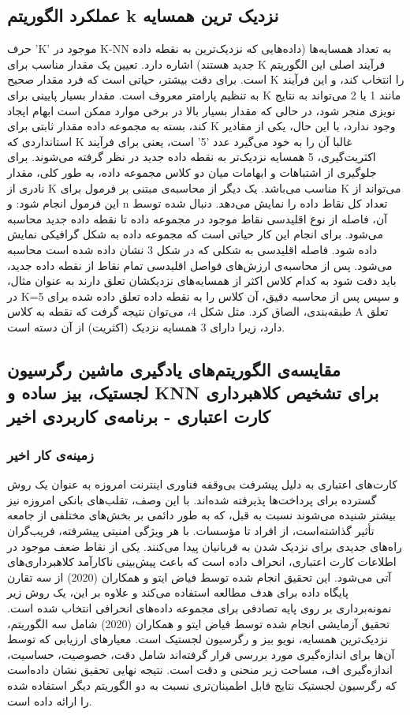 \documentclass{CSICC2020}
\begin{document}
\subsection{  عملکرد الگوریتم k نزدیک ترین همسایه}
حرف 'K' موجود در K-NN به تعداد همسایه‌ها (داده‌هایی که نزدیک‌ترین به نقطه داده جدید هستند) اشاره دارد. تعیین یک مقدار مناسب برای K فرآیند اصلی این الگوریتم است. برای دقت بیشتر، حیاتی است که فرد مقدار صحیح K را انتخاب کند، و این فرآیند به تنظیم پارامتر معروف است. مقدار بسیار پایینی برای K مانند 1 یا 2 می‌تواند به نتایج نویزی منجر شود، در حالی که مقدار بسیار بالا در برخی موارد ممکن است ابهام ایجاد کند، بسته به مجموعه داده مقدار ثابتی برای K وجود ندارد، با این حال، یکی از مقادیر استانداردی که K غالبا آن را به خود می‌گیرد عدد '5' است، یعنی برای فرآیند اکثریت‌گیری، 5 همسایه نزدیک‌تر به نقطه داده جدید در نظر گرفته می‌شوند. برای جلوگیری از اشتباهات و ابهامات میان دو کلاس مجموعه داده، به طور کلی، مقدار نادری از K مناسب می‌باشد. یک دیگر از محاسبه‌ی مبتنی بر فرمول برای K می‌تواند از این فرمول انجام شود: و n تعداد کل نقاط داده را نمایش می‌دهد. دنبال شده توسط آن، فاصله از نوع اقلیدسی نقاط موجود در مجموعه داده تا نقطه داده جدید محاسبه می‌شود. برای انجام این کار حیاتی است که مجموعه داده به شکل گرافیکی نمایش داده شود. فاصله اقلیدسی به شکلی که در شکل 3 نشان داده شده است محاسبه می‌شود. پس از محاسبه‌ی ارزش‌های فواصل اقلیدسی تمام نقاط از نقطه داده جدید، باید دقت شود به کدام کلاس اکثر از همسایه‌های نزدیکشان تعلق دارند به عنوان مثال، در K=5 و سپس پس از محاسبه دقیق، آن کلاس را به نقطه داده تعلق داده شده برای طبقه‌بندی، الصاق کرد. مثل شکل 4، می‌توان نتیجه گرفت که نقطه به کلاس A تعلق دارد، زیرا دارای 3 همسایه نزدیک (اکثریت) از آن دسته است.
\subsection{مقایسه‌ی الگوریتم‌های یادگیری ماشین رگرسیون لجستیک، بیز ساده و KNN  برای تشخیص کلاهبرداری کارت اعتباری - برنامه‌ی کاربردی اخیر}


\subsubsection{زمینه‌ی کار اخیر}
کارت‌های اعتباری به دلیل پیشرفت بی‌وقفه فناوری اینترنت امروزه به عنوان یک روش گسترده برای پرداخت‌ها پذیرفته شده‌اند. با این وصف، تقلب‌های بانکی امروزه نیز بیشتر شنیده می‌شوند نسبت به قبل، که به طور دائمی بر بخش‌های مختلفی از جامعه تأثیر گذاشته‌است، از افراد تا مؤسسات. با هر ویژگی امنیتی پیشرفته، فریب‌گران راه‌های جدیدی برای نزدیک شدن به قربانیان پیدا می‌کنند. یکی از نقاط ضعف موجود در اطلاعات کارت اعتباری، انحراف داده است که باعث پیش‌بینی ناکارآمد کلاهبرداری‌های آتی می‌شود. این تحقیق انجام شده توسط فیاض ایتو و همکاران (2020) از سه تقارن پایگاه داده برای هدف مطالعه استفاده می‌کند و علاوه بر این، یک روش زیر نمونه‌برداری بر روی پایه تصادفی برای مجموعه داده‌های انحرافی انتخاب شده است. تحقیق آزمایشی انجام شده توسط فیاض ایتو و همکاران (2020) شامل سه الگوریتم، نزدیک‌ترین همسایه، نویو بیز و رگرسیون لجستیک است. معیارهای ارزیابی که توسط آن‌ها برای اندازه‌گیری مورد بررسی قرار گرفته‌اند شامل دقت، خصوصیت، حساسیت، اندازه‌گیری اف، مساحت زیر منحنی و دقت است. نتیجه نهایی تحقیق نشان داده‌است که رگرسیون لجستیک نتایج قابل اطمینان‌تری نسبت به دو الگوریتم دیگر استفاده شده را ارائه داده است. 
\end{document}
